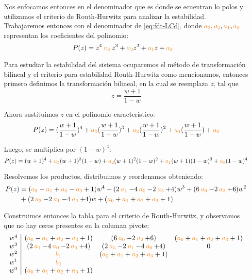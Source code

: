 Nos enfocamos entonces en el denominador que es donde se ecuentran lo polos y
utilizamos el criterio de Routh-Hurwitz para analizar la estabilidad. 
Trabajaremos entonces con el denominador de \eqref{eq:fdt-LCd}, donde $\nara{a_3},\nara{a_2},\nara{a_1},\nara{a_0}$
representan los coeficientes del polinomio:
\begin{align}
    P(z) = z^4 \nara{a_3}z^3 + \nara{a_2} z^2 + \nara{a_1} z + \nara{a_0} &
\end{align}

Para estudiar la estabilidad del sistema ocuparemos el método de transformación
bilineal y el criterio para estabilidad Routh-Hurwitz como mencionamos, entonces
primero definimos la transformación bilineal, en la cual se reemplaza $z$, tal que 
\begin{equation}
    z = \frac{w+1}{1-w}
\end{equation}

Ahora sustituimos $z$ en el polinomio característico:
\begin{equation}
    P(z) = (\frac{w+1}{1-w})^4 + \nara{a_3}(\frac{w+1}{1-w})^3 + \nara{a_2} (\frac{w+1}{1-w})^2 + \nara{a_1} (\frac{w+1}{1-w}) + \nara{a_0}
\end{equation}

Luego, se multiplica por $(1-w)^4$:
\begin{equation}
    P(z) = ({w+1})^4+ \nara{a_3}({w+1})^3(1-w)  + \nara{a_2} ({w+1})^2 (1-w) ^2+ \nara{a_1} ({w+1})(1-w)^3 + \nara{a_0}(1-w)^4
\end{equation}


Resolvemos los productos, distribuimos y reordenamos obteniendo:
\begin{align}
  P(z) &= (\nara{a_0} - \nara{a_1} + \nara{a_2} -\nara{a_3} + 1)w^4 +( 2\nara{a_1} - 4\nara{a_0} - 2 \nara{a_3} +4 ) w^3  
    + ( 6\nara{a_0} - 2\nara{a_2} +6 ) w^2 \nonumber \\
    &+ (2\nara{a_3} - 2\nara{a_1} - 4\nara{a_0} + 4 ) w +
    (\nara{a_0} + \nara{a_1} + \nara{a_2} +\nara{a_3} + 1)
\end{align}

Construimos entonces la tabla para el criterio de Routh-Hurwitz, y observamos
que no hay ceros presentes en la columan pivote:
\begin{equation}
  \begin{array}{c|ccc}
    w^4 & (\nara{a_0} - \nara{a_1} + \nara{a_2} -\nara{a_3} + 1) & ( 6\nara{a_0} - 2\nara{a_2} +6 )  &  (\nara{a_0} + \nara{a_1} + \nara{a_2} +\nara{a_3} + 1)\\
    w^3 &( 2\nara{a_1} - 4\nara{a_0} - 2 \nara{a_3} +4 )   &(2\nara{a_3} - 2\nara{a_1} - 4\nara{a_0} + 4 )  & 0\\
    w^2 & \nara{b_1} &  (\nara{a_0} + \nara{a_1} + \nara{a_2} +\nara{a_3} + 1)\\
    w^1 & \nara{b_0} &  \\
    w^0 &    (\nara{a_0} + \nara{a_1} + \nara{a_2} +\nara{a_3} + 1)  & 
  \end{array}
\end{equation}

